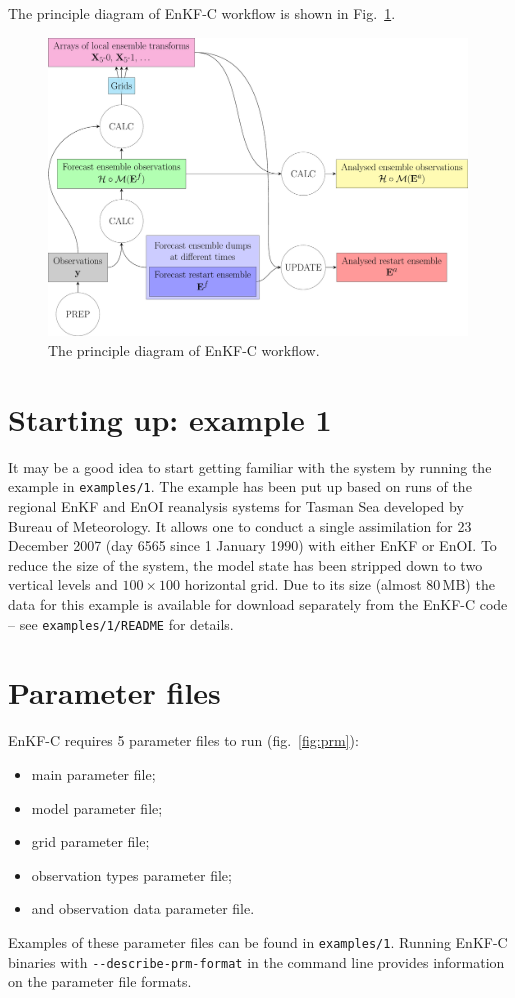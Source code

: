 \documentclass[11pt]{report}
\begin{document}
The principle diagram of EnKF-C workflow is shown in Fig.~\ref{fig:calcupdate}.
\begin{figure}
  \centering
  \includegraphics[width = 0.99\textwidth]{plots/enkfc.pdf}
  \caption{The principle diagram of EnKF-C workflow.}
  \label{fig:calcupdate}
\end{figure}

\section{Starting up: example 1}
\label{example1}

It may be a good idea to start getting familiar with the system by running the example in \verb|examples/1|.
The example has been put up based on runs of the regional EnKF and EnOI reanalysis systems for Tasman Sea developed by Bureau of Meteorology. 
It allows one to conduct a single assimilation for 23 December 2007 (day 6565 since 1 January 1990) with either EnKF or EnOI.
To reduce the size of the system, the model state has been stripped down to two vertical levels and $100 \times 100$ horizontal grid.
Due to its size (almost 80\,MB) the data for this example is available for download separately from the EnKF-C code -- see \verb|examples/1/README| for details.

\section{Parameter files}

EnKF-C requires 5 parameter files to run (fig.~\ref{fig:prm}):
\begin{itemize} 
\item main parameter file;
\item model parameter file;
\item grid parameter file;
\item observation types parameter file;
\item and observation data parameter file.
\end{itemize}
Examples of these parameter files can be found in \verb|examples/1|.
Running EnKF-C binaries with \verb|--describe-prm-format| in the command line provides information on the parameter file formats.
\end{document}
